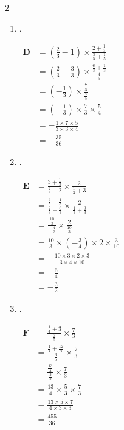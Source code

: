 \documentclass[12pt,a4paper]{article}
\begin{document}
\begin{multicols}{2}
\begin{enumerate}
\item .

$\begin{aligned}
            \textbf{D} &= \left(\frac{2}{3}-1\right)\times \frac{2+\frac{1}{3}}{\frac{3}{5}+\frac{1}{5}} \\[0.8em]
            &= \left(\frac{2}{3}-\frac{3}{3}\right) \times \frac{\frac{6}{3}+\frac{1}{3}}{\frac{4}{5}} \\[0.8em]
            &= \left(-\frac{1}{3}\right) \times \frac{\frac{7}{3}}{\frac{4}{5}} \\[0.8em]
            &= \left(-\frac{1}{3}\right) \times \frac{7}{3} \times \frac{5}{4} \\[0.5em]
            &= -\frac{1 \times 7 \times 5}{3 \times 3 \times 4} \\[0.5em]
            &= -\frac{35}{36}
        \end{aligned}$

\item .

$\begin{aligned}
            \textbf{E} &= \frac{3+\frac{1}{3}}{\frac{2}{3}-2} \times \frac{2}{\frac{1}{3}+3} \\[0.8em]
            &= \frac{\frac{9}{3}+\frac{1}{3}}{\frac{2}{3}-\frac{6}{3}} \times \frac{2}{\frac{1}{3}+\frac{9}{3}} \\[0.8em]
            &= \frac{\frac{10}{3}}{-\frac{4}{3}} \times \frac{2}{\frac{10}{3}} \\[0.8em]
            &= \frac{10}{3} \times \left(-\frac{3}{4}\right) \times 2 \times \frac{3}{10} \\[0.5em]
            &= -\frac{10 \times 3 \times 2 \times 3}{3 \times 4 \times 10} \\[0.5em]
            &= -\frac{6}{4} \\[0.5em]
            &= -\frac{3}{2}
        \end{aligned}$

\item .

$\begin{aligned}
            \textbf{F} &= \frac{\frac{1}{4}+3}{\frac{3}{5}} \times \frac{7}{3} \\[0.8em]
            &= \frac{\frac{1}{4}+\frac{12}{4}}{\frac{3}{5}} \times \frac{7}{3} \\[0.8em]
            &= \frac{\frac{13}{4}}{\frac{3}{5}} \times \frac{7}{3} \\[0.8em]
            &= \frac{13}{4} \times \frac{5}{3} \times \frac{7}{3} \\[0.5em]
            &= \frac{13 \times 5 \times 7}{4 \times 3 \times 3} \\[0.5em]
            &= \frac{455}{36}
        \end{aligned}$


\end{enumerate}
\end{multicols}
\end{document}
